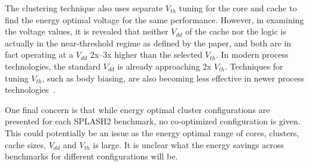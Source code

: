 The clustering technique also uses separate $V_{th}$ tuning for the core and cache to find the energy optimal voltage for the same performance.
However, in examining the voltage values, it is revealed that neither $V_{dd}$
of the cache nor the logic is actually in the near-threshold regime as defined
by the paper, and both are in fact operating at a $V_{dd}$ 2x--3x higher than
the selected $V_{th}$. In modern process technologies, the standard $V_{dd}$ is
already approaching 2x $V_{th}$.
Techniques for tuning $V_{th}$, such as body biasing, are also becoming less effective in newer process technologies~\cite{BodyBiasing3}.

One final concern is that while energy optimal cluster configurations are
presented for each SPLASH2 benchmark, no co-optimized configuration is given.
This could potentially be an issue as the energy optimal range of cores,
clusters, cache sizes, $V_{dd}$ and $V_{th}$ is large. It is unclear what the
energy savings across benchmarks for different configurations will be.
